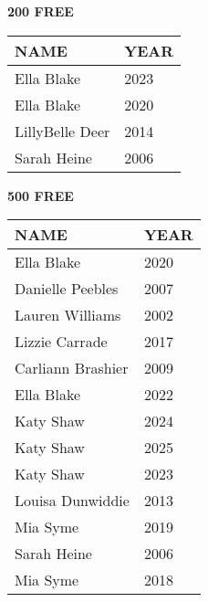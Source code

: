 \begin{table}[H]
\centering
\begin{minipage}[t]{0.48\textwidth}
\centering
\textbf{200 FREE}\\[0.1cm]
\begin{tabular}{@{}p{2.8cm}p{1.2cm}@{}}
\hline
    \textbf{NAME} & \textbf{YEAR} \\
\hline
    Ella Blake & 2023 \\
    Ella Blake & 2020 \\
    LillyBelle Deer & 2014 \\
    Sarah Heine & 2006 \\
\hline
\end{tabular}
\end{minipage}\hfill
\begin{minipage}[t]{0.48\textwidth}
\centering
\textbf{500 FREE}\\[0.1cm]
\begin{tabular}{@{}p{2.8cm}p{1.2cm}@{}}
\hline
    \textbf{NAME} & \textbf{YEAR} \\
\hline
    Ella Blake & 2020 \\
    Danielle Peebles & 2007 \\
    Lauren Williams & 2002 \\
    Lizzie Carrade & 2017 \\
    Carliann Brashier & 2009 \\
    Ella Blake & 2022 \\
    Katy Shaw & 2024 \\
    Katy Shaw & 2025 \\
    Katy Shaw & 2023 \\
    Louisa Dunwiddie & 2013 \\
    Mia Syme & 2019 \\
    Sarah Heine & 2006 \\
    Mia Syme & 2018 \\
\hline
\end{tabular}
\end{minipage}
\end{table}

